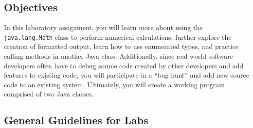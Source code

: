 




\vspace*{-.25in}
\subsection*{Objectives}

In this laboratory assignment, you will learn more about using the {\tt java.lang.Math} class to perform numerical
calculations, further explore the creation of formatted output, learn how to use enumerated types, and practice calling
methods in another Java class.  Additionally, since real-world software developers often have to debug source code
created by other developers and add features to existing code, you will participate in a ``bug hunt'' and add new
source code to an existing system. Ultimately, you will create a working program comprised of two Java classes.

\vspace*{-.1in}
\subsection*{General Guidelines for Labs}






